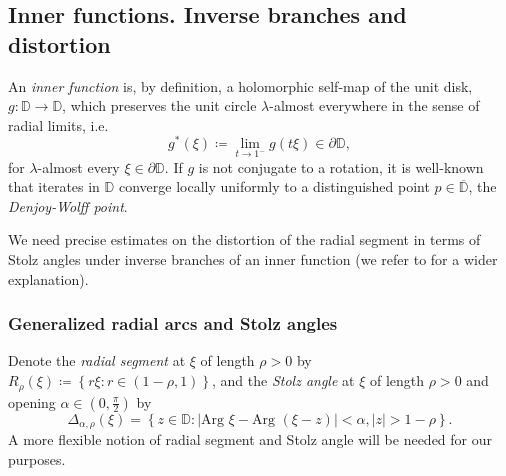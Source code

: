 \documentclass[11pt]{article}
\theoremstyle{definition}
\theoremstyle{remark}
\theoremstyle{plain}
\begin{document}
\subsection{Inner functions. Inverse branches and distortion}
An {\em inner function} is, by definition, a holomorphic self-map of the unit disk, $ g\colon\mathbb{D}\to\mathbb{D} $, which preserves the unit circle $ \lambda $-almost everywhere in the sense of radial limits, i.e. \[g^*(\xi)\coloneqq \lim\limits_{t\to 1^-}g(t\xi) \in\partial\mathbb{D},\] for $ \lambda $-almost every $ \xi\in\partial\mathbb{D} $. If $ g $ is not conjugate to a rotation, it is well-known that iterates in $ \mathbb{D} $ converge locally uniformly to a distinguished point $ p\in\overline{\mathbb{D}} $, the {\em Denjoy-Wolff point}.

We need precise estimates on the distortion of the radial segment in terms of Stolz angles under inverse branches of an inner function (we refer to \cite{Jove} for a wider explanation).

\subsubsection*{Generalized radial arcs and Stolz angles}
Denote the \textit{radial segment} at $ \xi $ of length $ \rho>0 $ by $R_{\rho}(\xi)\coloneqq \left\lbrace r\xi\colon r\in(1-\rho,1)\right\rbrace$,
and  the \textit{Stolz angle} at $ \xi $ of length $ \rho>0 $ and opening $ \alpha\in (0, \frac{\pi}{2}) $ by 	\[\Delta_{\alpha, \rho}(\xi)=\left\lbrace z\in\mathbb{D}\colon \left| \textrm{Arg }\xi- \textrm{Arg }(\xi-z)\right| <\alpha, \left| z \right| >1-\rho \right\rbrace .\] 
A more flexible notion of radial segment and Stolz angle will be needed for our purposes.
\end{document}
